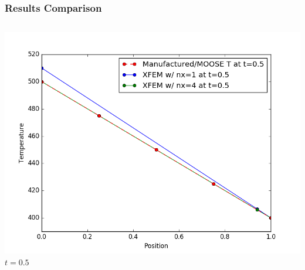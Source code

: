 \documentclass[]{beamer}
\begin{document}
\begin{frame}[t]\frametitle{Results Comparison}
  	\begin{columns}
			\begin{center}
			\includegraphics[scale=0.17]{figures/1D_xy_ls1m/1D_xy_ls1mat_u_vs_x_05}\\
			$t=0.5$
			
			\null
			

\end{center}
\end{columns}
\end{frame}
\end{document}

